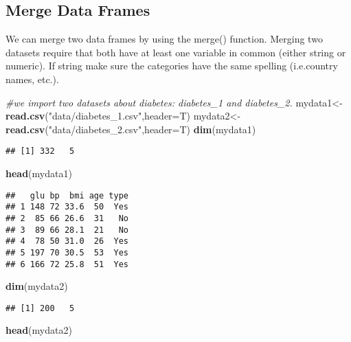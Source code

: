 \documentclass[]{book}
\newenvironment{Shaded}{\begin{snugshade}}{\end{snugshade}}
\newcommand{\KeywordTok}[1]{\textcolor[rgb]{0.13,0.29,0.53}{\textbf{#1}}}
\newcommand{\DataTypeTok}[1]{\textcolor[rgb]{0.13,0.29,0.53}{#1}}
\newcommand{\StringTok}[1]{\textcolor[rgb]{0.31,0.60,0.02}{#1}}
\newcommand{\CommentTok}[1]{\textcolor[rgb]{0.56,0.35,0.01}{\textit{#1}}}
\newcommand{\NormalTok}[1]{#1}
\theoremstyle{definition}
\theoremstyle{definition}
\theoremstyle{definition}
\theoremstyle{remark}
\begin{document}
\subsection{Merge Data Frames}\label{merge-data-frames}

We can merge two data frames by using the merge() function. Merging two
datasets require that both have at least one variable in common (either
string or numeric). If string make sure the categories have the same
spelling (i.e.country names, etc.).

\begin{Shaded}
\begin{Highlighting}[]
\CommentTok{#we import two datasets about diabetes: diabetes_1 and diabetes_2.}
\NormalTok{mydata1<-}\KeywordTok{read.csv}\NormalTok{(}\StringTok{"data/diabetes_1.csv"}\NormalTok{,}\DataTypeTok{header=}\NormalTok{T)}
\NormalTok{mydata2<-}\KeywordTok{read.csv}\NormalTok{(}\StringTok{"data/diabetes_2.csv"}\NormalTok{,}\DataTypeTok{header=}\NormalTok{T)}
\KeywordTok{dim}\NormalTok{(mydata1)}
\end{Highlighting}
\end{Shaded}

\begin{verbatim}
## [1] 332   5
\end{verbatim}

\begin{Shaded}
\begin{Highlighting}[]
\KeywordTok{head}\NormalTok{(mydata1)}
\end{Highlighting}
\end{Shaded}

\begin{verbatim}
##   glu bp  bmi age type
## 1 148 72 33.6  50  Yes
## 2  85 66 26.6  31   No
## 3  89 66 28.1  21   No
## 4  78 50 31.0  26  Yes
## 5 197 70 30.5  53  Yes
## 6 166 72 25.8  51  Yes
\end{verbatim}

\begin{Shaded}
\begin{Highlighting}[]
\KeywordTok{dim}\NormalTok{(mydata2)}
\end{Highlighting}
\end{Shaded}

\begin{verbatim}
## [1] 200   5
\end{verbatim}

\begin{Shaded}
\begin{Highlighting}[]
\KeywordTok{head}\NormalTok{(mydata2)}
\end{Highlighting}
\end{Shaded}
\end{document}

